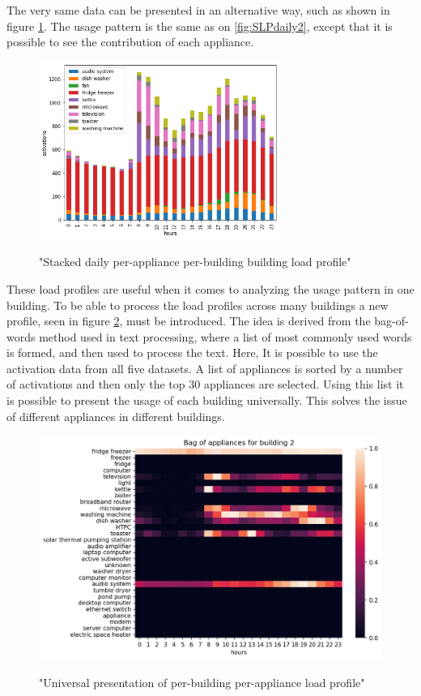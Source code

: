 The very same data can be presented in an alternative way, such as shown in figure \ref{fig:stack}.
The usage pattern is the same as on \ref{fig:SLPdaily2}, except that it is possible to see
the contribution of each appliance. 

\begin{figure}[H]
	\centering
	\caption{"Stacked daily per-appliance per-building building load profile"}
	\includegraphics[width=0.7\textwidth]{../Figures/LPS/stack.png}
	\label{fig:stack}
\end{figure}

These load profiles are useful when it comes to analyzing the usage pattern in one building.
To be able to process the load profiles across many buildings a new profile, seen in figure \ref{fig:BOA}, must be introduced.
The idea is derived from the bag-of-words method used in text processing, where a list of most commonly used words is formed, and then used to process the text. 
Here, It is possible to use the activation data from all five datasets.
A list of appliances is sorted by a number of activations and then only the top 30 appliances are selected.
Using this list it is possible to present the usage of each building universally. This solves the issue of different appliances in different buildings.


\begin{figure}[H]
	\centering
	\caption{"Universal presentation of per-building per-appliance load profile"}
	\includegraphics[width=1\textwidth]{../Figures/LPS/BOA.png}
	\label{fig:BOA}
\end{figure}


